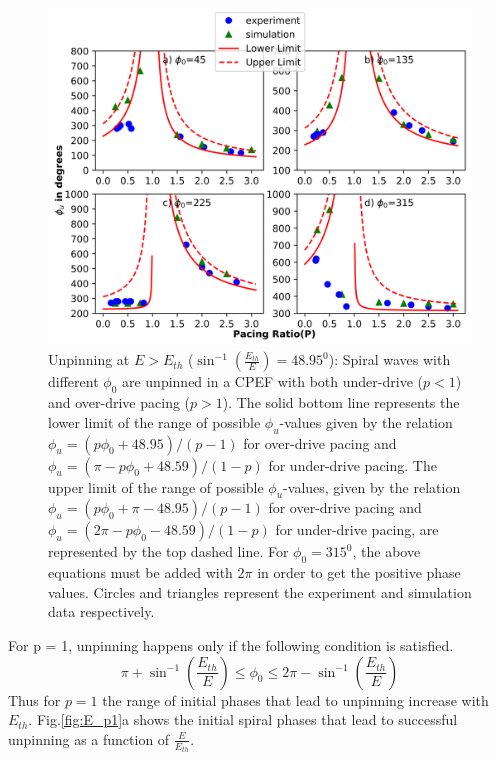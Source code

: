 \begin{figure}[htb!]
    \centering
    \includegraphics{E>Eth.png}
    \caption{Unpinning at $E>E_{th}$ 
    (${\sin^{-1}}{(\frac{E_{th}}{E})}=48.95^0$): Spiral waves with different
	${\phi}_0$ are unpinned in a CPEF with both under-drive ($p<1$) and
	over-drive pacing ($p>1$). The solid bottom line represents the lower
	limit of the range of possible ${\phi}_u$-values given by the relation
	${\phi}_u=(p{\phi}_0+48.95)/(p-1)$ for over-drive pacing and
	${\phi}_u=(\pi-p{\phi}_0+48.59)/(1-p)$ for under-drive pacing. The
	upper limit of the range of possible ${\phi}_u$-values, given by the
	relation ${\phi}_u=(p{\phi}_0+\pi-48.95)/(p-1)$ for over-drive pacing
	and ${\phi}_u=(2\pi-p{\phi}_0-48.59)/(1-p)$ for under-drive pacing, are
	represented by the top dashed line. For ${\phi}_0 = 315^0$, the above
	equations must be added with $2\pi$ in order to get the positive phase
	values.
    Circles and triangles represent the experiment and simulation data
	respectively.  }
    \label{fig:unpinning_E>Eth}
\end{figure}
For p = 1, unpinning happens only if the following condition is satisfied.
\begin{equation}
\pi+ \sin^{-1}(\frac{E_{th}}{E})  \leq \phi_0 \leq 2\pi-\sin^{-1}(\frac{E_{th}}{E})
\label{eq:p=1}
\end{equation} 
Thus for $p=1$ the range of initial phases that lead to
unpinning increase with $E_{th}$. Fig.\ref{fig:E_p1}a shows the initial spiral
phases that lead to successful unpinning as a function of $\frac{E}{E_{th}}$.


